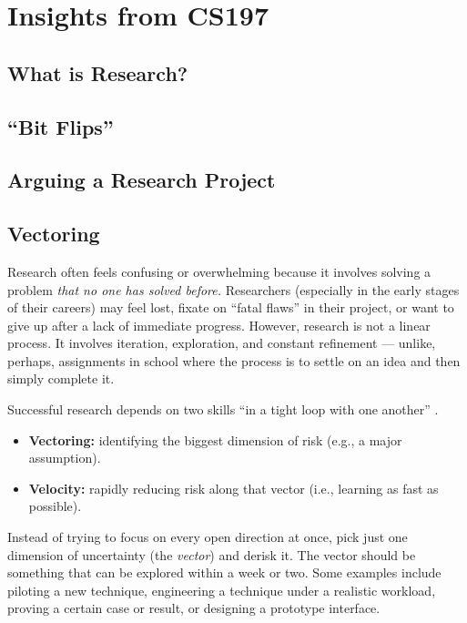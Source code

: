 
\section{Insights from CS197}
\label{sec:cs197_insights}

\subsection{What is Research?}
\subsection{``Bit Flips''}
\subsection{Arguing a Research Project}

\subsection{Vectoring}

Research often feels confusing or overwhelming because it involves solving a problem \textit{that no one has solved before.}
Researchers (especially in the early stages of their careers) may feel lost, fixate on ``fatal flaws'' in their project, or want to give up after a lack of immediate progress.
However, research is not a linear process.
It involves iteration, exploration, and constant refinement --- unlike, perhaps, assignments in school where the process is to settle on an idea and then simply complete it.

Successful research depends on two skills ``in a tight loop with one another'' .
\begin{itemize}
    \item \textbf{Vectoring:} identifying the biggest dimension of risk (e.g., a major assumption).
    \item \textbf{Velocity:} rapidly reducing risk along that vector (i.e., learning as fast as possible).
\end{itemize}

Instead of trying to focus on every open direction at once, pick just one dimension of uncertainty (the \textit{vector}) and derisk it.
The vector should be something that can be explored within a week or two.
Some examples include piloting a new technique, engineering a technique under a realistic workload, proving a certain case or result, or designing a prototype interface.

